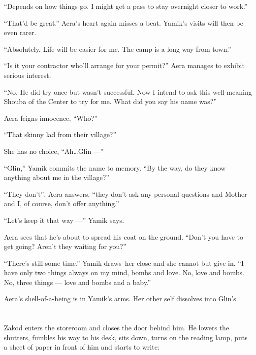 \documentclass[twoside,11pt,openany]{book}
\begin{document}
{}``Depends on how things go. I might get a pass to stay overnight closer to work.''

{}``That'd be great.'' Aera's heart again misses a beat. Yamik's visits will then be even rarer.

{}``Absolutely. Life will be easier for me. The camp is a long way from town.''

{}``Is it your contractor who'll arrange for your permit?'' Aera manages to exhibit serious interest.

{}``No. He did try once but wasn't successful. Now I intend to ask this well-meaning Shouba of the Center to try for me.
What did you say his name was?''

Aera feigns innocence, ``Who?''

{}``That skinny lad from their village?''

She has no choice, ``Ah{\ldots}Glin ---''

{}``Glin,{}'' Yamik commits the name to memory. ``By the way, do they know anything about me in the
village?''

``They don't'', Aera answers, ``they don't ask any personal questions and Mother
and I, of course, don't offer anything.''

``Let's keep it that way ---'' Yamik says.

Aera sees that he's about to spread his coat on the ground. ``Don't you have to get going? Aren't they waiting for
you?''

{}``There's still some time.'' Yamik draws~her close and she cannot but give in. ``I have only two things always on my
mind, bombs and love. No, love and bombs. No, three things --- love and bombs and a baby.''

Aera's shell-of-a-being is in Yamik's arms.{ }Her other self dissolves into Glin's.



\chapter{}

Zakod enters the storeroom and closes the door behind him. He lowers the shutters, fumbles his way to his desk, sits
down, turns on the reading lamp, puts a sheet of paper in front of him and starts to write:
\end{document}
